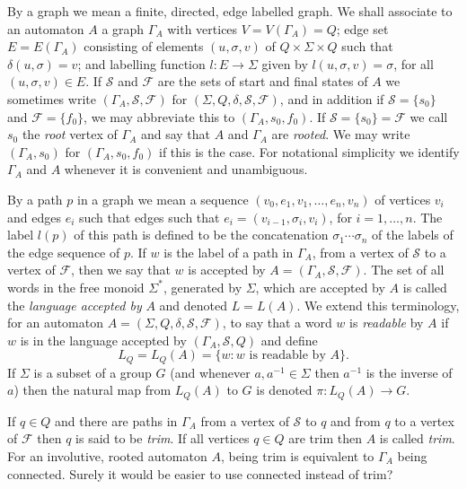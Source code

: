 \documentclass[a4paper,12pt]{article}
\newcommand{\G}{\Gamma }
\renewcommand{\d}{\delta }
\newcommand{\s}{\sigma }
\renewcommand{\S}{\Sigma }
\newcommand{\cF}{{\cal{F}}}
\newcommand{\cS}{{\cal{S}}}
\numberwithin{equation}{section}
\numberwithin{figure}{section}
\renewcommand{\cF}{\mathcal{F}}
\renewcommand{\cS}{\mathcal{S}}
\newcommand{\maps}{\rightarrow}
\begin{document}
By a graph we mean a finite, directed, edge labelled graph. 
We shall associate to an automaton $A$
a graph $\G_A$ with vertices
$V=V(\G_A)=Q$; edge set $E=E(\G_A)$ consisting of elements
$(u,\s,v)$ of $Q\times \S\times Q$ such that $\d(u,\s)=v$; and
labelling function $l:E\maps \S$ given by $l(u,\s,v)=\s$, for all
$(u,\s,v) \in E$.  If $\mathcal{S}$ and $\mathcal{F}$ are the sets
of start and final states of $A$ we sometimes write
$(\G_A,\mathcal{S},\mathcal{F})$ for
$(\S,Q,\d,\mathcal{S},\mathcal{F})$, and in addition if
$\mathcal{S}=\{s_0\}$ and $\mathcal{F}=\{f_0\}$, we may abbreviate 
this to $(\G_A,s_0,f_0)$. If $\mathcal{S}=\{s_0\}=\mathcal{F}$ 
we 
call $s_0$ the {\em root}
vertex of $\G_A$ and say that $A$ and $\G_A$ are {\em rooted}. We may
 write $(\G_A,s_0)$ for $(\G_A,s_0,f_0)$ if this is the case.  For notational simplicity we identify $\G_A$
and $A$ whenever it is convenient and unambiguous. 

By a path $p$ 
in a graph we mean a sequence $(v_0,e_1,v_1, \ldots , e_n ,v_n)$ of
 vertices $v_i$ and edges $e_i$ such that 
edges such that $e_i=(v_{i-1},\s_i,v_i)$, for $i=1,\ldots ,n$. 
The
label $l(p)$ of this  path is defined to be 
 the concatenation $\s_1\cdots \s_n$ of the labels of the
edge sequence of $p$.  If $w$ is the label of a path 
in $\G_A$, from a vertex of $\cS$ to a vertex of $\cF$, then we
say that $w$ is accepted by $A=(\G_A,\cS,\cF)$. The set of all
words in the free monoid $\S^*$, generated by $\S$, which are 
accepted by $A$  is called
the {\em language accepted by} $A$ and denoted $L=L(A)$.
We extend this terminology, for an automaton 
$A=(\S,Q,\d,\mathcal{S},\mathcal{F})$,  
to say that a  word $w$ is {\em readable} 
by $A$ if $w$ is in the
language accepted by $(\G_A,\cS,Q)$  and define 
\[L_Q=L_Q(A)=\{w:w \textrm{ is readable by } A\}.\]
If $\S$ is a
subset of a group $G$ (and whenever $a,a^{-1}\in \S$ then $a^{-1}$ is
the inverse of $a$) 
 then the  natural map from $L_Q(A)$ to
$G$ is denoted $\pi:L_Q(A)\maps G$. 

If $q\in Q$ and there are paths in $\G_A$ from a vertex of $\cS$ to $q$
and from $q$ to a vertex of $\cF$ then $q$ is said to be \emph{trim}. 
If all vertices $q\in Q$ are trim then $A$ is called \emph{trim}.
 {\ajd For an involutive, rooted automaton $A$, being trim is equivalent
to $\G_A$ being connected. Surely it would be easier to use 
connected instead of trim?} 
\end{document}
